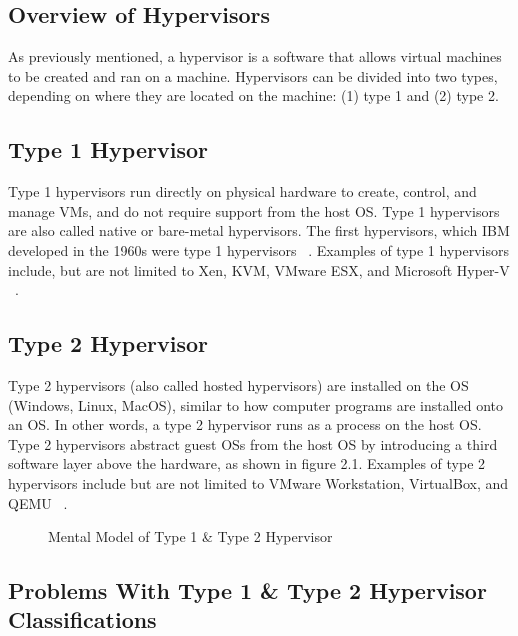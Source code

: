 \documentclass{report}
\begin{document}
\begin{spacing}{1.5}
\section{Overview of Hypervisors}

{\large
As previously mentioned, a hypervisor is a software that allows virtual machines to be created and ran on a machine. Hypervisors can be divided into two types, depending on where they are located on the machine: (1) type 1 and (2) type 2.
\newline
}

\subsection{Type 1 Hypervisor}

{\large
Type 1 hypervisors run directly on physical hardware to create, control, and manage VMs, and do not require support from the host OS. Type 1 hypervisors are also called native or bare-metal hypervisors. The first hypervisors, which IBM developed in the 1960s were type 1 hypervisors ~\cite{meier2008ibm}. Examples of type 1 hypervisors include, but are not limited to Xen, KVM, VMware ESX, and Microsoft Hyper-V ~\cite{bauman2015survey}.
\newline
}


\subsection{Type 2 Hypervisor}

{\large
Type 2 hypervisors (also called hosted hypervisors) are installed on the OS (Windows, Linux, MacOS), similar to how computer programs are installed onto an OS. In other words, a type 2 hypervisor runs as a process on the host OS. Type 2 hypervisors abstract guest OSs from the host OS by introducing a third software layer above the hardware, as shown in figure 2.1. Examples of type 2 hypervisors include but are not limited to VMware Workstation, VirtualBox, and QEMU ~\cite{bauman2015survey}.
\newline
}


\begin{figure}[ht]
    \caption{Mental Model of Type 1 \& Type 2 Hypervisor}
\end{figure}


\subsection{Problems With Type 1 \& Type 2 Hypervisor Classifications}


\end{spacing}
\end{document}
